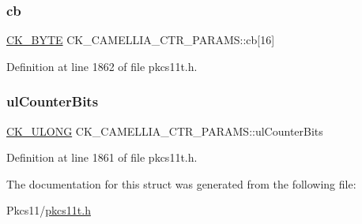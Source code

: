 \subsubsection{\texorpdfstring{cb}{cb}}
{\footnotesize\ttfamily \hyperlink{pkcs11t_8h_a51e605f881c86838bf12d70707b57b85}{C\+K\+\_\+\+B\+Y\+TE} C\+K\+\_\+\+C\+A\+M\+E\+L\+L\+I\+A\+\_\+\+C\+T\+R\+\_\+\+P\+A\+R\+A\+M\+S\+::cb\mbox{[}16\mbox{]}}



Definition at line 1862 of file pkcs11t.\+h.

\mbox{\label{struct_c_k___c_a_m_e_l_l_i_a___c_t_r___p_a_r_a_m_s_acd40627e7750b86612be7f02fdfa5515}} 
\subsubsection{\texorpdfstring{ul\+Counter\+Bits}{ulCounterBits}}
{\footnotesize\ttfamily \hyperlink{pkcs11t_8h_a35181858a3b7a0a81f49d180d8f446ef}{C\+K\+\_\+\+U\+L\+O\+NG} C\+K\+\_\+\+C\+A\+M\+E\+L\+L\+I\+A\+\_\+\+C\+T\+R\+\_\+\+P\+A\+R\+A\+M\+S\+::ul\+Counter\+Bits}



Definition at line 1861 of file pkcs11t.\+h.



The documentation for this struct was generated from the following file\+:\begin{DoxyCompactItemize}
\item 
Pkcs11/\hyperlink{pkcs11t_8h}{pkcs11t.\+h}\end{DoxyCompactItemize}
